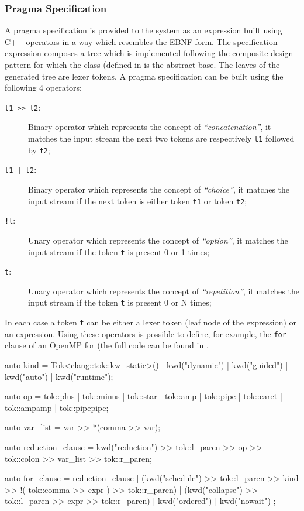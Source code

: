 \subsubsection{Pragma Specification}

A pragma specification is provided to the system as an expression built using
C++ operators in a way which resembles the EBNF form. The specification
expression composes a tree which is implemented following the composite design
pattern for which the  class (defined in
 is the abstract base. The leaves of the
generated tree are lexer tokens. A pragma specification can be built using the
following 4 operators:

\begin{description}
\item [{\tt t1 >> t2}:] Binary operator which represents the concept of
\emph{``concatenation''}, it matches the input stream the next two tokens are
respectively {\tt t1} followed by {\tt t2};

\item [{\tt t1 | t2}:] Binary operator which represents the concept of
\emph{``choice''}, it matches the input stream if the next token is either token
{\tt t1} or token {\tt t2};

\item [{\tt !t}:] Unary operator which represents the concept of
\emph{``option''}, it matches the input stream if the token {\tt t} is present 0
or 1 times;

\item [{\tt *t}:] Unary operator which represents the concept of
\emph{``repetition''}, it matches the input stream if the token {\tt t} is
present 0 or N times;
\end{description}

In each case a token {\tt t} can be either a lexer token (leaf node of the
expression) or an expression. Using these operators is possible to define, for
example, the {\tt for} clause of an OpenMP for (the full code can be found in
.

\begin{srcCode}
auto kind =  
	Tok<clang::tok::kw_static>() | kwd("dynamic") | kwd("guided") | 
	kwd("auto") | kwd("runtime");

auto op = tok::plus | tok::minus | tok::star | tok::amp |
		  tok::pipe | tok::caret | tok::ampamp | tok::pipepipe;

auto var_list = var >> *(comma >> var);

auto reduction_clause = kwd("reduction") >> 
	tok::l_paren >> op >> tok::colon >> var_list >> tok::r_paren;

auto for_clause =	
	    reduction_clause
	|	(kwd("schedule") >> tok::l_paren >> kind >> 
		!( tok::comma >> expr ) >> tok::r_paren)
	|	(kwd("collapse") >> tok::l_paren >> expr >> tok::r_paren)
	|   kwd("ordered") | kwd("nowait") 
	;
\end{srcCode}

